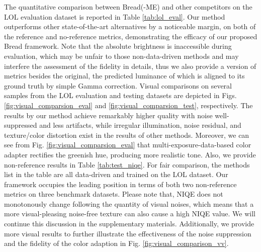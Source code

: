 \documentclass[10pt,twocolumn,letterpaper]{article}
\begin{document}
The quantitative comparison between Bread(-ME) and other competitors on the LOL evaluation dataset is reported in Table \ref{tab:lol_eval}. Our method outperforms other state-of-the-art alternatives by a noticeable margin, on both of the reference and no-reference metrics, demonstrating the efficacy of our proposed Bread framework.
Note that the absolute brightness is inaccessible during evaluation, which may be unfair to those non-data-driven methods and may interfere the assessment of the fidelity in details, thus we also provide a version of metrics besides the original, the predicted luminance of which is aligned to its ground truth by simple Gamma correction. Visual comparisons on several samples from the LOL evaluation and testing datasets are depicted in Figs. \ref{fig:visual_comparsion_eval} and \ref{fig:visual_comparsion_test}, respectively. The results by our method achieve remarkably higher quality with noise well-suppressed and less artifacts, while irregular illumination, noise residual, and texture/color distortion exist in the results of other methods. Moreover, we can see from Fig. \ref{fig:visual_comparsion_eval} that multi-exposure-data-based color adapter rectifies the greenish hue, producing more realistic tone. Also, we provide non-reference results in Table \ref{tab:test_niqe}. For fair comparison, the methods list in the table are all data-driven and trained on the LOL dataset. Our framework occupies the leading position in terms of both two non-reference metrics on three benchmark datasets. Please note that, NIQE does not monotonously change following the quantity of visual noises, which means that a more visual-pleasing noise-free texture can also cause a high NIQE value. We will continue this discussion in the supplementary materials. Additionally, we provide more visual results to further illustrate the effectiveness of the noise suppression and the fidelity of the color adaption in Fig. \ref{fig:visual_comparison_vv}. 
\end{document}
